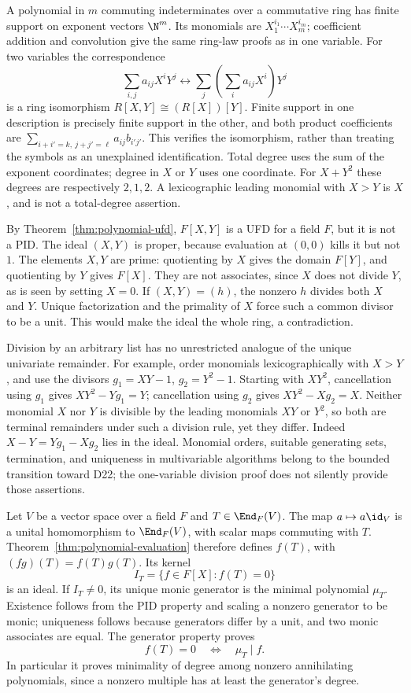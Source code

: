 A polynomial in $m$ commuting indeterminates over a commutative ring
has finite support on exponent vectors $\N^m$. Its monomials are
$X_1^{i_1}\cdots X_m^{i_m}$; coefficient addition and convolution
give the same ring-law proofs as in one variable.
For two variables the correspondence
\[
 \sum_{i,j}a_{ij}X^iY^j
 \longleftrightarrow
 \sum_j\left(\sum_i a_{ij}X^i\right)Y^j
\]
is a ring isomorphism $R[X,Y]\cong(R[X])[Y]$.
Finite support in one description is precisely finite support
in the other, and both product coefficients are
$\sum_{i+i'=k,\ j+j'=\ell}a_{ij}b_{i'j'}$.
This verifies the isomorphism, rather than treating the symbols
as an unexplained identification.
Total degree uses the sum of the exponent coordinates; degree
in $X$ or $Y$ uses one coordinate. For $X+Y^2$ these degrees
are respectively $2,1,2$. A lexicographic leading monomial with
$X>Y$ is $X$, and is not a total-degree assertion.

By Theorem~\ref{thm:polynomial-ufd}, $F[X,Y]$ is a UFD for a field
$F$, but it is not a PID. The ideal $(X,Y)$ is proper, because
evaluation at $(0,0)$ kills it but not $1$.
The elements $X,Y$ are prime: quotienting by $X$ gives the domain
$F[Y]$, and quotienting by $Y$ gives $F[X]$.
They are not associates, since $X$ does not divide $Y$, as is
seen by setting $X=0$. If $(X,Y)=(h)$, the nonzero $h$ divides
both $X$ and $Y$. Unique factorization and the primality of $X$
force such a common divisor to be a unit. This would make the
ideal the whole ring, a contradiction.

Division by an arbitrary list has no unrestricted analogue of the
unique univariate remainder. For example, order monomials
lexicographically with $X>Y$, and use the divisors
$g_1=XY-1$, $g_2=Y^2-1$. Starting with $XY^2$, cancellation
using $g_1$ gives
$XY^2-Yg_1=Y$; cancellation using $g_2$ gives
$XY^2-Xg_2=X$. Neither monomial $X$ nor $Y$ is divisible
by the leading monomials $XY$ or $Y^2$, so both are terminal
remainders under such a division rule, yet they differ.
Indeed $X-Y=Yg_1-Xg_2$ lies in the ideal.
Monomial orders, suitable generating sets, termination,
and uniqueness in multivariable algorithms belong to the
bounded transition toward D22; the one-variable division proof
does not silently provide those assertions.

Let $V$ be a vector space over a field $F$ and $T\in\End_F(V)$.
The map $a\mapsto a\id_V$ is a unital homomorphism to
$\End_F(V)$, with scalar maps commuting with $T$.
Theorem~\ref{thm:polynomial-evaluation} therefore defines $f(T)$,
with $(fg)(T)=f(T)g(T)$. Its kernel
\[
 I_T=\{f\in F[X]:f(T)=0\}
\]
is an ideal. If $I_T\ne0$, its unique monic generator is the
minimal polynomial $\mu_T$. Existence follows from the PID
property and scaling a nonzero generator to be monic; uniqueness
follows because generators differ by a unit, and two monic
associates are equal. The generator property proves
\[
 f(T)=0\quad\Longleftrightarrow\quad \mu_T\mid f.
\]
In particular it proves minimality of degree among nonzero
annihilating polynomials, since a nonzero multiple has at least
the generator's degree.

